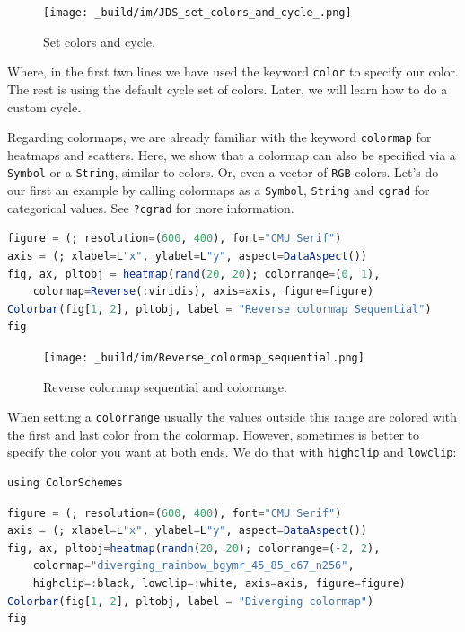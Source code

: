 \documentclass[
  notoc %
]{tufte-book}
\newcommand{\passthrough}[1]{#1}
\begin{document}
\begin{figure}
\hypertarget{fig:set_colors_and_cycle}{%
\centering
\texttt{[image: \_build/im/JDS\_set\_colors\_and\_cycle\_.png]}
\caption{Set colors and cycle.}\label{fig:set_colors_and_cycle}
}
\end{figure}

Where, in the first two lines we have used the keyword
\passthrough{\lstinline!color!} to specify our color. The rest is using
the default cycle set of colors. Later, we will learn how to do a custom
cycle.

Regarding colormaps, we are already familiar with the keyword
\passthrough{\lstinline!colormap!} for heatmaps and scatters. Here, we
show that a colormap can also be specified via a
\passthrough{\lstinline!Symbol!} or a \passthrough{\lstinline!String!},
similar to colors. Or, even a vector of \passthrough{\lstinline!RGB!}
colors. Let's do our first an example by calling colormaps as a
\passthrough{\lstinline!Symbol!}, \passthrough{\lstinline!String!} and
\passthrough{\lstinline!cgrad!} for categorical values. See
\passthrough{\lstinline!?cgrad!} for more information.

\begin{lstlisting}[language=Julia]
figure = (; resolution=(600, 400), font="CMU Serif")
axis = (; xlabel=L"x", ylabel=L"y", aspect=DataAspect())
fig, ax, pltobj = heatmap(rand(20, 20); colorrange=(0, 1),
    colormap=Reverse(:viridis), axis=axis, figure=figure)
Colorbar(fig[1, 2], pltobj, label = "Reverse colormap Sequential")
fig
\end{lstlisting}

\begin{figure}
\hypertarget{fig:Reverse_colormap_sequential}{%
\centering
\texttt{[image: \_build/im/Reverse\_colormap\_sequential.png]}
\caption{Reverse colormap sequential and
colorrange.}\label{fig:Reverse_colormap_sequential}
}
\end{figure}

When setting a \passthrough{\lstinline!colorrange!} usually the values
outside this range are colored with the first and last color from the
colormap. However, sometimes is better to specify the color you want at
both ends. We do that with \passthrough{\lstinline!highclip!} and
\passthrough{\lstinline!lowclip!}:

\begin{lstlisting}
using ColorSchemes
\end{lstlisting}

\begin{lstlisting}[language=Julia]
figure = (; resolution=(600, 400), font="CMU Serif")
axis = (; xlabel=L"x", ylabel=L"y", aspect=DataAspect())
fig, ax, pltobj=heatmap(randn(20, 20); colorrange=(-2, 2),
    colormap="diverging_rainbow_bgymr_45_85_c67_n256",
    highclip=:black, lowclip=:white, axis=axis, figure=figure)
Colorbar(fig[1, 2], pltobj, label = "Diverging colormap")
fig
\end{lstlisting}
\end{document}
